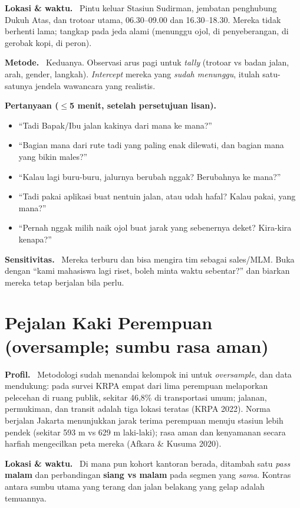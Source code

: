 \documentclass[11pt,a4paper]{report}
\newcommand{\fld}[1]{\smallskip\noindent\textbf{#1.}\ }
\begin{document}
\fld{Lokasi \& waktu} Pintu keluar Stasiun Sudirman, jembatan penghubung Dukuh Atas, dan
trotoar utama, 06.30--09.00 dan 16.30--18.30. Mereka tidak berhenti lama; tangkap pada
jeda alami (menunggu ojol, di penyeberangan, di gerobak kopi, di peron).

\fld{Metode} Keduanya. Observasi arus pagi untuk \emph{tally} (trotoar vs badan jalan,
arah, gender, langkah). \emph{Intercept} mereka yang \emph{sudah menunggu}, itulah satu-
satunya jendela wawancara yang realistis.

\fld{Pertanyaan ($\leq$5 menit, setelah persetujuan lisan)}
\begin{itemize}
  \item ``Tadi Bapak/Ibu jalan kakinya dari mana ke mana?''
  \item ``Bagian mana dari rute tadi yang paling enak dilewati, dan bagian mana yang bikin males?''
  \item ``Kalau lagi buru-buru, jalurnya berubah nggak? Berubahnya ke mana?''
  \item ``Tadi pakai aplikasi buat nentuin jalan, atau udah hafal? Kalau pakai, yang mana?''
  \item ``Pernah nggak milih naik ojol buat jarak yang sebenernya deket? Kira-kira kenapa?''
\end{itemize}

\fld{Sensitivitas} Mereka terburu dan bisa mengira tim sebagai sales/MLM. Buka dengan
``kami mahasiswa lagi riset, boleh minta waktu sebentar?'' dan biarkan mereka tetap
berjalan bila perlu.

\section{Pejalan Kaki Perempuan \textnormal{(oversample; sumbu rasa aman)}}
\fld{Profil} Metodologi sudah menandai kelompok ini untuk \emph{oversample}, dan data
mendukung: pada survei KRPA empat dari lima perempuan melaporkan pelecehan di ruang
publik, sekitar 46,8\% di transportasi umum; jalanan, permukiman, dan transit adalah
tiga lokasi teratas (KRPA 2022). Norma berjalan Jakarta menunjukkan jarak terima
perempuan menuju stasiun lebih pendek (sekitar 593 m vs 629 m laki-laki); rasa aman dan
kenyamanan secara harfiah mengecilkan peta mereka (Afkara \& Kusuma 2020).

\fld{Lokasi \& waktu} Di mana pun kohort kantoran berada, ditambah satu \emph{pass}
\textbf{malam} dan perbandingan \textbf{siang vs malam} pada segmen yang \emph{sama}.
Kontras antara sumbu utama yang terang dan jalan belakang yang gelap adalah temuannya.
\end{document}
